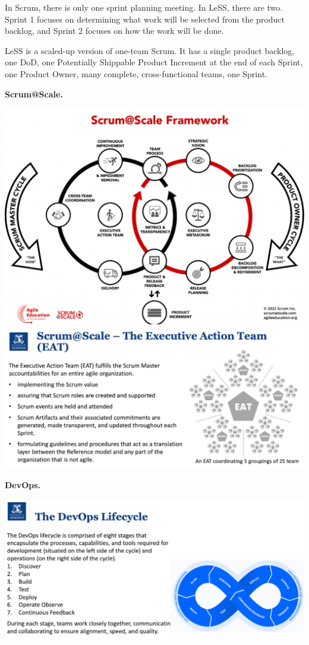In Scrum, there is only one sprint planning meeting. In LeSS, there are two. Sprint 1 focuses on determining what work will be selected from the product backlog, and Sprint 2 focuses on how the work will be done.

LeSS is a scaled-up version of one-team Scrum. It has a single product backlog, one DoD, one Potentially Shippable Product Increment at the end of each Sprint, one Product Owner, many complete, cross-functional teams, one Sprint.

\textbf{Scrum@Scale.}

\includegraphics[width=\linewidth]{figs/SCR-20240606-swrt.png}
\includegraphics[width=\linewidth]{figs/SCR-20240606-szho.png}

\textbf{DevOps.}

\includegraphics[width=\linewidth]{figs/SCR-20240606-taig.png}

